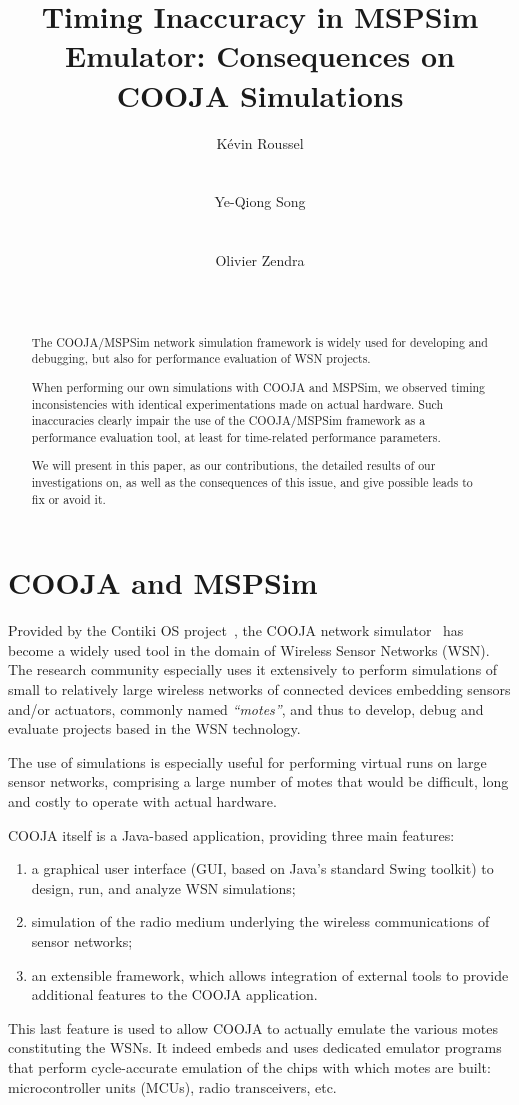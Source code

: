 \documentclass[10pt]{ewsn-proc}
\author{
\alignauthor K\'evin Roussel \\
        \affaddr{INRIA Nancy Grand-Est}\\
        \affaddr{615, rue du Jardin Botanique}\\
        \affaddr{54600 Villers-l\`es-Nancy, France}
       \email{kevin.roussel@inria.fr}
\alignauthor Ye-Qiong Song \\
        \affaddr{LORIA/INRIA Nancy Grand-Est}\\
        \affaddr{615, rue du Jardin Botanique}\\
        \affaddr{54600 Villers-l\`es-Nancy, France}
       \email{ye-qiong.song@loria.fr}
\alignauthor Olivier Zendra \\
        \affaddr{INRIA Nancy Grand-Est}\\
        \affaddr{615, rue du Jardin Botanique}\\
        \affaddr{54600 Villers-l\`es-Nancy, France}
       \email{olivier.zendra@inria.fr}
}
\title{Timing Inaccuracy in MSPSim Emulator: Consequences on COOJA Simulations}
\begin{document}
\maketitle


\begin{abstract}
The COOJA/MSPSim network simulation framework is widely used for developing
and debugging, but also for performance evaluation of WSN projects.

When performing our own simulations with COOJA and MSPSim, we observed timing
inconsistencies with identical experimentations made on actual hardware.
Such inaccuracies clearly impair the use of the COOJA/MSPSim framework as
a performance evaluation tool, at least for time-related performance
parameters.

We will present in this paper, as our contributions, the detailed results of
our investigations on, as well as the consequences of this issue,
and give possible leads to fix or avoid it.
\end{abstract}



\section{COOJA and MSPSim}
\label{introduction}

Provided by the Contiki OS project~\cite{ContikiOS}, the COOJA network
simulator~\cite{Cooja} has become a widely used tool in the domain of
Wireless Sensor Networks (WSN). The research community especially uses
it extensively to perform simulations of small to relatively large wireless
networks of connected devices embedding sensors and/or actuators, commonly
named \emph{``motes''}, and thus to develop, debug and evaluate projects
based in the WSN technology.

The use of simulations is especially useful for performing virtual runs
on large sensor networks, comprising a large number of motes that would
be difficult, long and costly to operate with actual hardware.

COOJA itself is a Java-based application, providing three main features:
\begin{enumerate}
\item a graphical user interface (GUI, based on Java's standard Swing toolkit)
to design, run, and analyze WSN simulations;
\item simulation of the radio medium underlying the wireless communications
of sensor networks;
\item an extensible framework, which allows integration of external tools
to provide additional features to the COOJA application.
\end{enumerate}
This last feature is used to allow COOJA to actually emulate the various
motes constituting the WSNs. It indeed embeds and uses dedicated emulator
programs that perform cycle-accurate emulation of the chips with which motes
are built: microcontroller units (MCUs), radio transceivers, etc.
\end{document}
